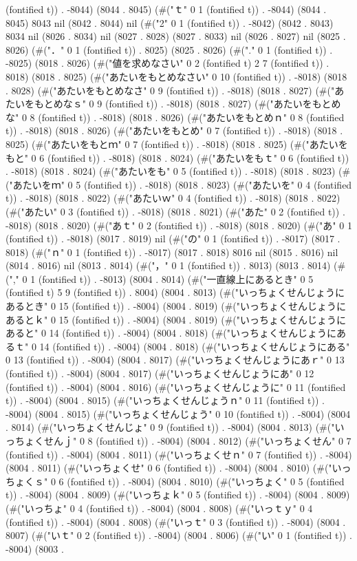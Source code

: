 (fontified t)) . -8044) (8044 . 8045) (#("ｔ" 0 1 (fontified t)) . -8044) (8044 . 8045) 8043 nil (8042 . 8044) nil (#("2" 0 1 (fontified t)) . -8042) (8042 . 8043) 8034 nil (8026 . 8034) nil (8027 . 8028) (8027 . 8033) nil (8026 . 8027) nil (8025 . 8026) (#("．" 0 1 (fontified t)) . 8025) (8025 . 8026) (#("." 0 1 (fontified t)) . -8025) (8018 . 8026) (#("値を求めなさい" 0 2 (fontified t) 2 7 (fontified t)) . 8018) (8018 . 8025) (#("あたいをもとめなさい" 0 10 (fontified t)) . -8018) (8018 . 8028) (#("あたいをもとめなさ" 0 9 (fontified t)) . -8018) (8018 . 8027) (#("あたいをもとめなｓ" 0 9 (fontified t)) . -8018) (8018 . 8027) (#("あたいをもとめな" 0 8 (fontified t)) . -8018) (8018 . 8026) (#("あたいをもとめｎ" 0 8 (fontified t)) . -8018) (8018 . 8026) (#("あたいをもとめ" 0 7 (fontified t)) . -8018) (8018 . 8025) (#("あたいをもとｍ" 0 7 (fontified t)) . -8018) (8018 . 8025) (#("あたいをもと" 0 6 (fontified t)) . -8018) (8018 . 8024) (#("あたいをもｔ" 0 6 (fontified t)) . -8018) (8018 . 8024) (#("あたいをも" 0 5 (fontified t)) . -8018) (8018 . 8023) (#("あたいをｍ" 0 5 (fontified t)) . -8018) (8018 . 8023) (#("あたいを" 0 4 (fontified t)) . -8018) (8018 . 8022) (#("あたいｗ" 0 4 (fontified t)) . -8018) (8018 . 8022) (#("あたい" 0 3 (fontified t)) . -8018) (8018 . 8021) (#("あた" 0 2 (fontified t)) . -8018) (8018 . 8020) (#("あｔ" 0 2 (fontified t)) . -8018) (8018 . 8020) (#("あ" 0 1 (fontified t)) . -8018) (8017 . 8019) nil (#("の" 0 1 (fontified t)) . -8017) (8017 . 8018) (#("ｎ" 0 1 (fontified t)) . -8017) (8017 . 8018) 8016 nil (8015 . 8016) nil (8014 . 8016) nil (8013 . 8014) (#("，" 0 1 (fontified t)) . 8013) (8013 . 8014) (#("," 0 1 (fontified t)) . -8013) (8004 . 8014) (#("一直線上にあるとき" 0 5 (fontified t) 5 9 (fontified t)) . 8004) (8004 . 8013) (#("いっちょくせんじょうにあるとき" 0 15 (fontified t)) . -8004) (8004 . 8019) (#("いっちょくせんじょうにあるとｋ" 0 15 (fontified t)) . -8004) (8004 . 8019) (#("いっちょくせんじょうにあると" 0 14 (fontified t)) . -8004) (8004 . 8018) (#("いっちょくせんじょうにあるｔ" 0 14 (fontified t)) . -8004) (8004 . 8018) (#("いっちょくせんじょうにある" 0 13 (fontified t)) . -8004) (8004 . 8017) (#("いっちょくせんじょうにあｒ" 0 13 (fontified t)) . -8004) (8004 . 8017) (#("いっちょくせんじょうにあ" 0 12 (fontified t)) . -8004) (8004 . 8016) (#("いっちょくせんじょうに" 0 11 (fontified t)) . -8004) (8004 . 8015) (#("いっちょくせんじょうｎ" 0 11 (fontified t)) . -8004) (8004 . 8015) (#("いっちょくせんじょう" 0 10 (fontified t)) . -8004) (8004 . 8014) (#("いっちょくせんじょ" 0 9 (fontified t)) . -8004) (8004 . 8013) (#("いっちょくせんｊ" 0 8 (fontified t)) . -8004) (8004 . 8012) (#("いっちょくせん" 0 7 (fontified t)) . -8004) (8004 . 8011) (#("いっちょくせｎ" 0 7 (fontified t)) . -8004) (8004 . 8011) (#("いっちょくせ" 0 6 (fontified t)) . -8004) (8004 . 8010) (#("いっちょくｓ" 0 6 (fontified t)) . -8004) (8004 . 8010) (#("いっちょく" 0 5 (fontified t)) . -8004) (8004 . 8009) (#("いっちょｋ" 0 5 (fontified t)) . -8004) (8004 . 8009) (#("いっちょ" 0 4 (fontified t)) . -8004) (8004 . 8008) (#("いっｔｙ" 0 4 (fontified t)) . -8004) (8004 . 8008) (#("いっｔ" 0 3 (fontified t)) . -8004) (8004 . 8007) (#("いｔ" 0 2 (fontified t)) . -8004) (8004 . 8006) (#("い" 0 1 (fontified t)) . -8004) (8003 . 